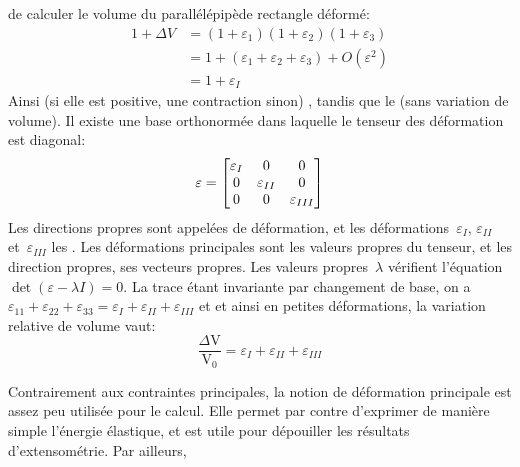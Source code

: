 de calculer le volume du parallélépipède rectangle déformé:
\begin{equation}\begin{aligned}
	1 + \Delta V &= (1+\varepsilon_1) (1+\varepsilon_2) (1+\varepsilon_3)\\
		& = 1+( \varepsilon_1+\varepsilon_2+\varepsilon_3)+O(\varepsilon^2) \\
		&= 1+\varepsilon_I
\end{aligned}\end{equation}
Ainsi 
(si elle est positive, une contraction sinon) ,
tandis que le  (sans variation de volume).
\medskipvm
Il existe une base orthonormée dans laquelle le tenseur des déformation est diagonal:
\begin{equation} \varepsilon = \MM*{\varepsilon_I &0&0\\ 0&\varepsilon_{II}&0\\ 0&0&\varepsilon_{III}} \end{equation}
Les directions propres sont appelées  de déformation,
et les déformations~$\varepsilon_I$, $\varepsilon_{II}$ et~$\varepsilon_{III}$ les .
\medskipvm
Les déformations principales sont les valeurs propres du tenseur, et les direction propres, ses vecteurs propres.
Les valeurs propres~$\lambda$ vérifient l'équation~$\det(\varepsilon - \lambda I) = 0$.
\medskipvm
{} La trace étant invariante par changement de base, on a~$\varepsilon_{11}+\varepsilon_{22}+\varepsilon_{33}
=\varepsilon_{I}+\varepsilon_{II}+\varepsilon_{III}$ et et ainsi en petites déformations, la variation relative
de volume vaut:
\begin{equation}
  \frac{\Delta \mathrm{V}}{\mathrm{V}_0} = \varepsilon_{I} + \varepsilon_{II} + \varepsilon_{III}
\end{equation}

Contrairement aux contraintes principales, la notion de déformation principale est assez peu utilisée pour le calcul.
Elle permet par contre d'exprimer de manière simple l'énergie élastique, et est utile pour dépouiller les
résultats d'extensométrie.
Par ailleurs, 


